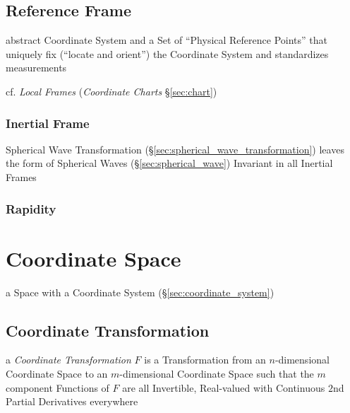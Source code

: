 \subsection{Reference Frame}\label{sec:reference_frame}

abstract Coordinate System and a Set of ``Physical Reference Points'' that
uniquely fix (``locate and orient'') the Coordinate System and standardizes
measurements

cf. \emph{Local Frames} (\emph{Coordinate Charts} \S\ref{sec:chart})



\subsubsection{Inertial Frame}\label{sec:inertial_frame}

Spherical Wave Transformation (\S\ref{sec:spherical_wave_transformation})
leaves the form of Spherical Waves (\S\ref{sec:spherical_wave}) Invariant in
all Inertial Frames



\subsubsection{Rapidity}\label{sec:rapidity}



\section{Coordinate Space}\label{sec:coordinate_space}

a Space with a Coordinate System (\S\ref{sec:coordinate_system})



\subsection{Coordinate Transformation}\label{sec:coordinate_transformation}

a \emph{Coordinate Transformation} $F$ is a Transformation from an
$n$-dimensional Coordinate Space to an $m$-dimensional Coordinate Space such
that the $m$ component Functions of $F$ are all Invertible, Real-valued with
Continuous $2$nd Partial Derivatives everywhere

